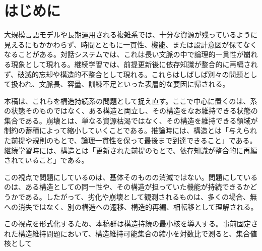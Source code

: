 \documentclass[12pt,a4paper]{article}
\begin{document}
\begin{abstract}
経験的主張として現時点で前面に出すべきものは三つである。第一に、LLM 推論実験では、単なる文脈長ではなく構造矛盾の質が崩壊を予測する。第二に、ランダム 3-SAT の計算コストは、構造的パラメータ \(L\) に対して \(\mu_{c} \propto e^{cL}\) の形で整理される。第三に、Mixed-SAT/NAE-SAT では、ドリフトで重みづけした \texttt{L\_plus\_n} predictor が raw count + \(n\) baseline を上回り、その凍結済み検証パッケージは外部実行者 3 名による再実行でも primary output と support flags が再現された。ただし、これは普遍法則の確立ではなく、観測可能性の層に応じた主張強度を分けた経験的支持である。詳細な数値、no-support branch、未完了の別系統 replication は evidence map と各 analysis note に委ねる。

本稿は、主理論 spine、仕様固定構造層、構造推定層、条件付き構造埋め込み層、実装含意を一つの見取り図として提示するための入口であり、詳細な導出と実験条件は各分冊および補論に委ねる。
\end{abstract}

\section{はじめに}\label{ux306fux3058ux3081ux306b}

大規模言語モデルや長期運用される複雑系では、十分な資源が残っているように見えるにもかかわらず、時間とともに一貫性、機能、または設計意図が保てなくなることがある。対話システムでは、これは長い文脈の中で論理的一貫性が崩れる現象として現れる。継続学習では、前提更新後に依存知識が整合的に再編されず、破滅的忘却や構造的不整合として現れる。これらはしばしば別々の問題として扱われ、文脈長、容量、訓練不足といった表層的な要因に帰される。

本稿は、これらを構造持続系の問題として捉え直す。ここで中心に置くのは、系の状態そのものではなく、ある構造と両立し、その構造をなお維持できる状態の集合である。崩壊とは、単なる資源枯渇ではなく、その構造を維持できる領域が制約の蓄積によって縮小していくことである。推論時には、構造とは「与えられた前提や規則のもとで、論理一貫性を保って最後まで到達できること」である。継続学習時には、構造とは「更新された前提のもとで、依存知識が整合的に再編されていること」である。

この視点で問題にしているのは、基体そのものの消滅ではない。問題にしているのは、ある構造としての同一性や、その構造が担っていた機能が持続できるかどうかである。したがって、劣化や崩壊として観測されるものは、多くの場合、無への消失ではなく、別の構造への遷移、構造的再編、相転移として理解される。

この視点を形式化するため、本稿群は構造持続の最小核を導入する。事前固定された構造維持問題において、構造維持可能集合の縮小を対数比で測ると、集合値核として
\end{document}
